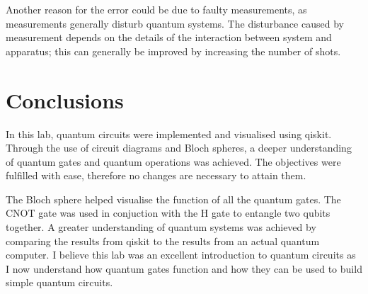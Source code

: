 Another reason for the error could be due to faulty measurements, as measurements generally disturb quantum systems. The disturbance caused by measurement depends on the details of the interaction between system and apparatus; this can generally be improved by increasing the number of shots.

\section{Conclusions}

In this lab, quantum circuits were implemented and visualised using qiskit. Through the use of circuit diagrams and Bloch spheres, a deeper understanding of quantum gates and quantum operations was achieved. The objectives were fulfilled with ease, therefore no changes are necessary to attain them.

The Bloch sphere helped visualise the function of all the quantum gates. The CNOT gate was used in conjuction with the H gate to entangle two qubits together. A greater understanding of quantum systems was achieved by comparing the results from qiskit to the results from an actual quantum computer. I believe this lab was an excellent introduction to quantum circuits as I now understand how quantum gates function and how they can be used to build simple quantum circuits.